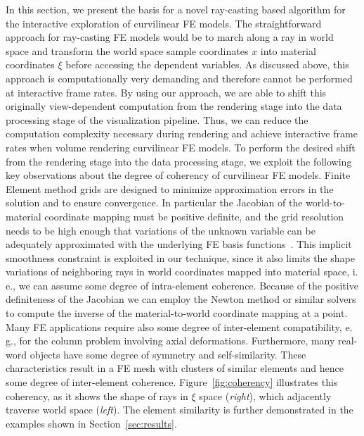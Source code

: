 \documentclass[review,journal]{vgtc}         %
\begin{document}
In this section, we present the basis for a novel ray-casting based algorithm for the interactive exploration of curvilinear FE models. The straightforward approach for ray-casting FE models would be to march along a ray in world space and transform the world space sample coordinates $x$ into material coordinates $\xi$ before accessing the dependent variables. As discussed above, this approach is computationally very demanding and therefore cannot be performed at interactive frame rates. By using our approach, we are able to shift this originally view-dependent computation from the rendering stage into the data processing stage of the visualization pipeline. Thus, we can reduce the computation complexity necessary during rendering and achieve interactive frame rates when volume rendering curvilinear FE models. To perform the desired shift from the rendering stage into the data processing stage, we exploit the following key observations about the degree of coherency of curvilinear FE models. Finite Element method grids are designed to minimize approximation errors in the solution and to ensure convergence. In particular the Jacobian of the world-to-material coordinate mapping must be positive definite, and the grid resolution needs to be high enough that variations of the unknown variable can be adequately approximated with the underlying FE basis functions~\cite{knupp07meshquality}. This implicit smoothness constraint is exploited in our technique, since it also limits the shape variations of neighboring rays in world coordinates mapped into material space, i.\,e., we can assume some degree of intra-element coherence. Because of the positive definiteness of the Jacobian we can employ the Newton method or similar solvers to compute the inverse of the material-to-world coordinate mapping at a point. Many FE applications require also some degree of inter-element compatibility, e.\,g., for the column problem involving axial deformations. Furthermore, many real-word objects have some degree of symmetry and self-similarity. These characteristics result in a FE mesh with clusters of similar elements and hence some degree of inter-element coherence. Figure~\ref{fig:coherency} illustrates this coherency, as it shows the shape of rays in $\xi$ space ({\it right}), which adjacently traverse world space ({\it left}). The element similarity is further demonstrated in the examples shown in Section~\ref{sec:results}.
\end{document}
